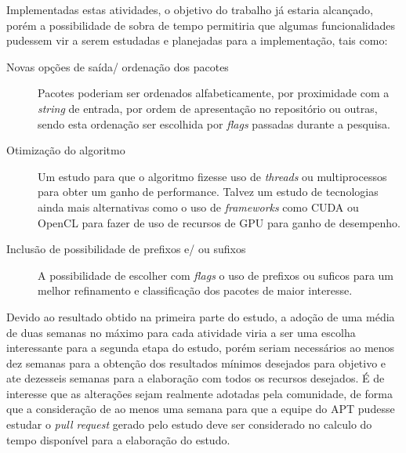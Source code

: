 Implementadas estas atividades, o objetivo do trabalho já estaria alcançado, porém a possibilidade de sobra de tempo permitiria que algumas funcionalidades pudessem vir a serem estudadas e planejadas para a implementação, tais como:

\begin{description}
	\item [Novas opções de saída/ ordenação dos pacotes] Pacotes poderiam ser ordenados alfabeticamente, por proximidade com a \textit{string} de entrada, por ordem de apresentação no repositório ou outras, sendo esta ordenação ser escolhida por \textit{flags} passadas durante a pesquisa.
	\item [Otimização do algoritmo] Um estudo para que o algoritmo fizesse uso de \textit{threads} ou multiprocessos para obter um ganho de performance. Talvez um estudo de tecnologias ainda mais alternativas como o uso de \textit{frameworks} como CUDA ou OpenCL para fazer de uso de recursos de GPU para ganho de desempenho.
	\item [Inclusão de possibilidade de prefixos e/ ou sufixos] A possibilidade de escolher com \textit{flags} o uso de prefixos ou suficos para um melhor refinamento e classificação dos pacotes de maior interesse.
\end{description}

Devido ao resultado obtido na primeira parte do estudo, a adoção de uma média de duas semanas no máximo para cada atividade viria a ser uma escolha interessante para a segunda etapa do estudo, porém seriam necessários ao menos dez semanas para a obtenção dos resultados mínimos desejados para objetivo e ate dezesseis semanas para a elaboração com todos os recursos desejados. É de interesse que as alterações sejam realmente adotadas pela comunidade, de forma que a consideração de ao menos uma semana para que a equipe do APT pudesse estudar o \textit{pull request} gerado pelo estudo deve ser considerado no calculo do tempo disponível para a elaboração do estudo.



